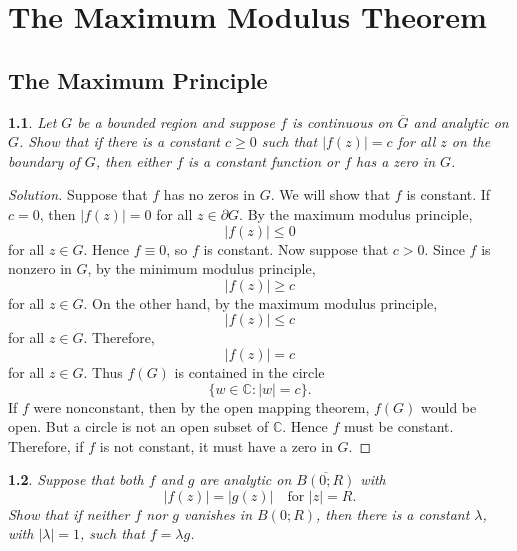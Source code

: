 \documentclass[12pt, a4paper]{report}
\theoremstyle{spaced}
\newtheorem{exercise}{}
\newcommand{\setexercise}[1]{\setcounter{exercise}{#1-1}}
\begin{document}
\chapter{The Maximum Modulus Theorem}
\section{The Maximum Principle}
\setexercise{2}
\begin{exercise}
	Let $G$ be a bounded region and suppose $f$ is continuous on $\overline{G}$ and analytic on $G$. Show that if there is a constant $c \ge 0$ such that $|f(z)| = c$ for all $z$ on the boundary of $G$, then either $f$ is a constant function or $f$ has a zero in $G$.
\end{exercise}
\begin{proof}[Solution]
	Suppose that \(f\) has no zeros in \(G\). We will show that \(f\) is constant.
	If \(c=0\), then \(|f(z)|=0\) for all \(z\in \partial G\). By the maximum modulus principle,
	\[
		|f(z)|\leq 0
	\]
	for all \(z\in G\). Hence \(f\equiv 0\), so \(f\) is constant.
	Now suppose that \(c>0\). Since \(f\) is nonzero in \(G\), by the minimum modulus principle,
	\[
		|f(z)|\geq c
	\]
	for all \(z\in G\). On the other hand, by the maximum modulus principle,
	\[
		|f(z)|\leq c
	\]
	for all \(z\in G\). Therefore,
	\[
		|f(z)|=c
	\]
	for all \(z\in G\).
	Thus \(f(G)\) is contained in the circle
	\[
		\{w\in\mathbb{C}:|w|=c\}.
	\]
	If \(f\) were nonconstant, then by the open mapping theorem, \(f(G)\) would be open. But a circle is not an open subset of \(\mathbb{C}\). Hence \(f\) must be constant.
	Therefore, if \(f\) is not constant, it must have a zero in \(G\).
\end{proof}

\setexercise{6}
\begin{exercise}
	Suppose that both $f$ and $g$ are analytic on $\overline{B(0;R)}$ with
	\[
		|f(z)| = |g(z)| \quad \text{for } |z| = R.
	\]
	Show that if neither $f$ nor $g$ vanishes in $B(0;R)$, then there is a constant $\lambda$, with $|\lambda| = 1$, such that $f = \lambda g$.
\end{exercise}
\end{document}
